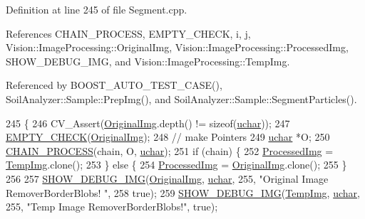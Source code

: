 Definition at line 245 of file Segment.\+cpp.



References C\+H\+A\+I\+N\+\_\+\+P\+R\+O\+C\+E\+S\+S, E\+M\+P\+T\+Y\+\_\+\+C\+H\+E\+C\+K, i, j, Vision\+::\+Image\+Processing\+::\+Original\+Img, Vision\+::\+Image\+Processing\+::\+Processed\+Img, S\+H\+O\+W\+\_\+\+D\+E\+B\+U\+G\+\_\+\+I\+M\+G, and Vision\+::\+Image\+Processing\+::\+Temp\+Img.



Referenced by B\+O\+O\+S\+T\+\_\+\+A\+U\+T\+O\+\_\+\+T\+E\+S\+T\+\_\+\+C\+A\+S\+E(), Soil\+Analyzer\+::\+Sample\+::\+Prep\+Img(), and Soil\+Analyzer\+::\+Sample\+::\+Segment\+Particles().


\begin{DoxyCode}
245                                                            \{
246   CV\_Assert(\hyperlink{class_vision_1_1_image_processing_a77c370dab270158a4e9c634e2d3f48e7}{OriginalImg}.depth() != \textcolor{keyword}{sizeof}(\hyperlink{_soil_math_types_8h_a65f85814a8290f9797005d3b28e7e5fc}{uchar}));
247   \hyperlink{_image_processing_8h_a27c4e53b88a0f9f2c097add555131056}{EMPTY\_CHECK}(\hyperlink{class_vision_1_1_image_processing_a77c370dab270158a4e9c634e2d3f48e7}{OriginalImg});
248   \textcolor{comment}{// make Pointers}
249   \hyperlink{_soil_math_types_8h_a65f85814a8290f9797005d3b28e7e5fc}{uchar} *O;
250   \hyperlink{_image_processing_8h_a6e6f0183cb53c76ef458d4fd34e07bcd}{CHAIN\_PROCESS}(chain, O, \hyperlink{_soil_math_types_8h_a65f85814a8290f9797005d3b28e7e5fc}{uchar});
251   \textcolor{keywordflow}{if} (chain) \{
252     \hyperlink{class_vision_1_1_image_processing_aa7d65742882cd1b2a1e4e9cb68809211}{ProcessedImg} = \hyperlink{class_vision_1_1_image_processing_a5371ad8d6f7aac9d43ee5c902ade7435}{TempImg}.clone();
253   \} \textcolor{keywordflow}{else} \{
254     \hyperlink{class_vision_1_1_image_processing_aa7d65742882cd1b2a1e4e9cb68809211}{ProcessedImg} = \hyperlink{class_vision_1_1_image_processing_a77c370dab270158a4e9c634e2d3f48e7}{OriginalImg}.clone();
255   \}
256 
257   \hyperlink{_vision_debug_8h_aae864fa4f990213a4184a209ff236202}{SHOW\_DEBUG\_IMG}(\hyperlink{class_vision_1_1_image_processing_a77c370dab270158a4e9c634e2d3f48e7}{OriginalImg}, \hyperlink{_soil_math_types_8h_a65f85814a8290f9797005d3b28e7e5fc}{uchar}, 255, \textcolor{stringliteral}{"Original Image RemoverBorderBlobs!
      "},
258                  \textcolor{keyword}{true});
259   \hyperlink{_vision_debug_8h_aae864fa4f990213a4184a209ff236202}{SHOW\_DEBUG\_IMG}(\hyperlink{class_vision_1_1_image_processing_a5371ad8d6f7aac9d43ee5c902ade7435}{TempImg}, \hyperlink{_soil_math_types_8h_a65f85814a8290f9797005d3b28e7e5fc}{uchar}, 255, \textcolor{stringliteral}{"Temp Image RemoverBorderBlobs!"}, \textcolor{keyword}{true});

\end{DoxyCode}

